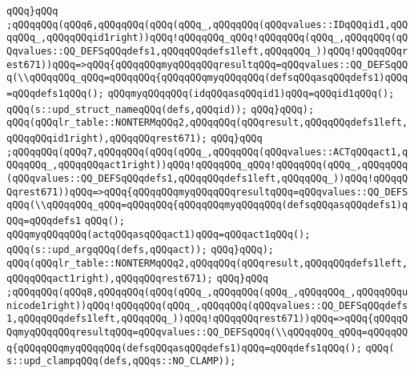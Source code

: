\verb|qQQq}qQQq|\newline
\verb|;qQQqqQQq(qQQq6,qQQqqQQq(qQQq(qQQq_,qQQqqQQq(qQQqvalues::IDqQQqid1,qQQqqQQq_,qQQqqQQqid1right))qQQq!qQQqqQQq_qQQq!qQQqqQQq(qQQq_,qQQqqQQq(qQQqvalues::QQ_DEFSqQQqdefs1,qQQqqQQqdefs1left,qQQqqQQq_))qQQq!qQQqqQQqrest671))qQQq=>qQQq{qQQqqQQqmyqQQqqQQqresultqQQq=qQQqvalues::QQ_DEFSqQQq(\\qQQqqQQq_qQQq=qQQqqQQq{qQQqqQQqmyqQQqqQQq(defsqQQqasqQQqdefs1)qQQq=qQQqdefs1qQQq();|\newline
\newline
\verb|qQQqmyqQQqqQQq(idqQQqasqQQqid1)qQQq=qQQqid1qQQq();|\newline
\verb|qQQq(s::upd_struct_nameqQQq(defs,qQQqid));|\newline
\verb|qQQq}qQQq);|\newline
\verb|qQQq(qQQqlr_table::NONTERMqQQq2,qQQqqQQq(qQQqresult,qQQqqQQqdefs1left,qQQqqQQqid1right),qQQqqQQqrest671);|\newline
\verb|qQQq}qQQq|\newline
\verb|;qQQqqQQq(qQQq7,qQQqqQQq(qQQq(qQQq_,qQQqqQQq(qQQqvalues::ACTqQQqact1,qQQqqQQq_,qQQqqQQqact1right))qQQq!qQQqqQQq_qQQq!qQQqqQQq(qQQq_,qQQqqQQq(qQQqvalues::QQ_DEFSqQQqdefs1,qQQqqQQqdefs1left,qQQqqQQq_))qQQq!qQQqqQQqrest671))qQQq=>qQQq{qQQqqQQqmyqQQqqQQqresultqQQq=qQQqvalues::QQ_DEFSqQQq(\\qQQqqQQq_qQQq=qQQqqQQq{qQQqqQQqmyqQQqqQQq(defsqQQqasqQQqdefs1)qQQq=qQQqdefs1|\newline
\verb|qQQq();|\newline
\verb|qQQqmyqQQqqQQq(actqQQqasqQQqact1)qQQq=qQQqact1qQQq();|\newline
\verb|qQQq(s::upd_argqQQq(defs,qQQqact));|\newline
\verb|qQQq}qQQq);|\newline
\verb|qQQq(qQQqlr_table::NONTERMqQQq2,qQQqqQQq(qQQqresult,qQQqqQQqdefs1left,qQQqqQQqact1right),qQQqqQQqrest671);|\newline
\verb|qQQq}qQQq|\newline
\verb|;qQQqqQQq(qQQq8,qQQqqQQq(qQQq(qQQq_,qQQqqQQq(qQQq_,qQQqqQQq_,qQQqqQQqunicode1right))qQQq!qQQqqQQq(qQQq_,qQQqqQQq(qQQqvalues::QQ_DEFSqQQqdefs1,qQQqqQQqdefs1left,qQQqqQQq_))qQQq!qQQqqQQqrest671))qQQq=>qQQq{qQQqqQQqmyqQQqqQQqresultqQQq=qQQqvalues::QQ_DEFSqQQq(\\qQQqqQQq_qQQq=qQQqqQQq{qQQqqQQqmyqQQqqQQq(defsqQQqasqQQqdefs1)qQQq=qQQqdefs1qQQq();|\newline
\verb|qQQq(|\newline
\verb|s::upd_clampqQQq(defs,qQQqs::NO_CLAMP));|\newline
